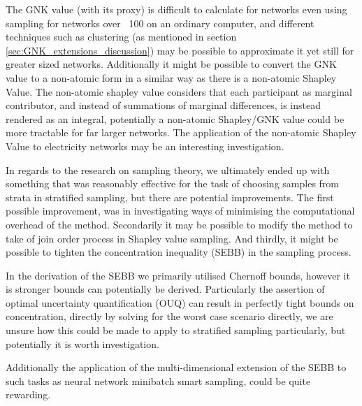The GNK value (with its proxy) is difficult to calculate for networks even using sampling for networks over ~100 on an ordinary computer, and different techniques such as clustering (as mentioned in section \ref{sec:GNK_extensions_discussion}) may be possible to approximate it yet still for greater sized networks.
Additionally it might be possible to convert the GNK value to a non-atomic form in a similar way as there is a non-atomic Shapley Value.
The non-atomic shapley value considers that each participant as marginal contributor, and instead of summations of marginal differences, is instead rendered as an integral, potentially a non-atomic Shapley/GNK value could be more tractable for far larger networks.
The application of the non-atomic Shapley Value to electricity networks may be an interesting investigation.

In regards to the research on sampling theory, we ultimately ended up with something that was reasonably effective for the task of choosing samples from strata in stratified sampling, but there are potential improvements.
The first possible improvement, was in investigating ways of minimising the computational overhead of the method.
Secondarily it may be possible to modify the method to take of join order process in Shapley value sampling.
And thirdly, it might be possible to tighten the concentration inequality (SEBB) in the sampling process.

In the derivation of the SEBB we primarily utilised Chernoff bounds, however it is stronger bounds can potentially be derived.
Particularly the assertion of optimal uncertainty quantification (OUQ) can result in perfectly tight bounds on concentration, directly by solving for the worst case scenario directly, we are unsure how this could be made to apply to stratified sampling particularly, but potentially it is worth investigation.\citep{OUQ1,doi:10.1137/13094712X}

Additionally the application of the multi-dimensional extension of the SEBB to such tasks as neural network minibatch smart sampling, could be quite rewarding.








